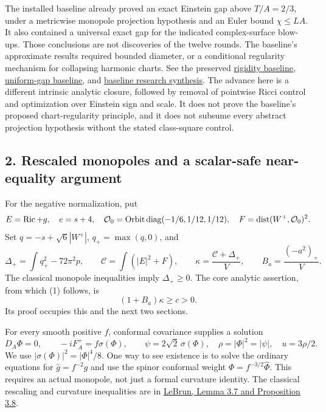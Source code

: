 \documentclass[
  english,
]{article}
\begin{document}
The installed baseline already proved an exact Einstein gap above
\(T/A=2/3\), under a metricwise monopole projection hypothesis and an
Euler bound \(\chi\le LA\). It also contained a universal exact gap for
the indicated complex-surface blow-ups. Those conclusions are not
discoveries of the twelve rounds. The baseline's approximate results
required bounded diameter, or a conditional regularity mechanism for
collapsing harmonic charts. See the preserved
\href{../baseline/research/20260916_rigidity.tex}{rigidity baseline},
\href{../baseline/research/20260916_uniform_gap.tex}{uniform-gap
baseline}, and \href{../baseline/research/20260916.md}{baseline research
synthesis}. The advance here is a different intrinsic analytic closure,
followed by removal of pointwise Ricci control and optimization over
Einstein sign and scale. It does not prove the baseline's proposed
chart-regularity principle, and it does not subsume every abstract
projection hypothesis without the stated class-square control.

\hypertarget{rescaled-monopoles-and-a-scalar-safe-near-equality-argument}{%
\subsection{2. Rescaled monopoles and a scalar-safe near-equality
argument}\label{rescaled-monopoles-and-a-scalar-safe-near-equality-argument}}

For the negative normalization, put \[
 E=\operatorname{Ric}+g,\quad e=s+4,\quad
 \mathcal O_0={\rm Orbit}\,
       {\rm diag}(-1/6,1/12,1/12),\quad
 F=\operatorname{dist}(W^+,\mathcal O_0)^2 .
\] Set \(q=-s+\sqrt6|W^+|\), \(q_+=\max(q,0)\), and \[
 \Delta_+=\int q_+^2-72\pi^2p,\qquad
 \mathcal C=\int(|E|^2+F),\qquad
 \kappa=\frac{\mathcal C+\Delta_+}{V},\qquad
 B_a=\frac{(-a^2)_+}{V}.
                                                               \tag{2}
\] The classical monopole inequalities imply \(\Delta_+\ge0\). The core
analytic assertion, from which (1) follows, is \[
                         (1+B_a)\kappa\ge c>0.             \tag{3}
\] Its proof occupies this and the next two sections.

For every smooth positive \(f\), conformal covariance supplies a
solution \[
 D_A\Phi=0,\qquad -iF_A^+=f\sigma(\Phi),\qquad
 \psi=2\sqrt2\,\sigma(\Phi),\quad
 \rho=|\Phi|^2=|\psi|,\quad u=3\rho/2.
                                                               \tag{4}
\] We use \(|\sigma(\Phi)|^2=|\Phi|^4/8\). One way to see existence is
to solve the ordinary equations for \(\widehat g=f^{-2}g\) and use the
spinor conformal weight \(\Phi=f^{-3/2}\widehat\Phi\). This requires an
actual monopole, not just a formal curvature identity. The classical
rescaling and curvature inequalities are in
\href{https://arxiv.org/abs/math/0611450}{LeBrun, Lemma 3.7 and
Proposition 3.8}.
\end{document}
